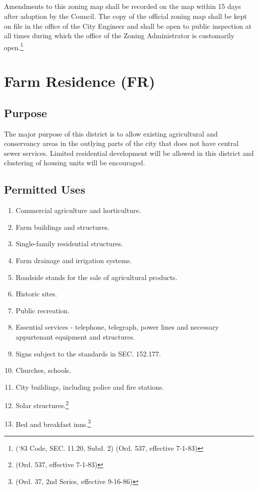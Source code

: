 \subsection{}
Amendments to this zoning map shall be recorded on the map within 15 days after adoption by the Council.  The copy of the official zoning map shall be kept on file in the office of the City Engineer and shall be open to public inspection at all times during which the office of the Zoning Administrator is customarily open.\footnote{(‘83 Code, SEC. 11.20, Subd. 2)  (Ord. 537, effective 7-1-83)}


\setcounter{section}{34}
\section{Farm Residence (FR)}
\subsection{Purpose}
The major purpose of this district is to allow existing agricultural and conservancy areas in the outlying parts of the city that does not have central sewer services. Limited residential development will be allowed in this district and clustering of housing units will be encouraged.
\subsection{Permitted Uses}
\begin{enumerate}[{\indent}1)]
    \item Commercial agriculture and horticulture.
    \item Farm buildings and structures.
    \item Single-family residential structures.
    \item Farm drainage and irrigation systems.
    \item Roadside stands for the sale of agricultural products.
    \item Historic sites.
    \item Public recreation.
    \item Essential services - telephone, telegraph, power lines and necessary appurtenant equipment and structures.
    \item Signs subject to the standards in SEC. 152.177.
    \item Churches, schools.
    \item City buildings, including police and fire stations.
    \item Solar structures.\footnote{(Ord. 537, effective 7-1-83)}
    \item Bed and breakfast inns.\footnote{(Ord. 37, 2nd Series, effective 9-16-86)}
\end{enumerate}
